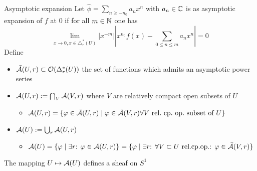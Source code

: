 \begin{frame}{Asymptotic expansion}
Let $\hat\phi=\sum_{n\geq -n_0}a_nx^n$ with $a_n\in\mathbb{C}$ is as asymptotic
expansion of $f$ at $0$ if for all $m\in\mathbb{N}$ one has
\begin{equation} \label{eq:asymptoticExpansion}
  \lim_{x\to 0,x\in\triangle_r^*(U)}
  \left|x^{-m}\right|\left|x^{n_{0}}f(x)-\sum_{0\leq n\leq m}a_{n}x^{n}\right|
  =0
\end{equation}
Define
\begin{itemize}
  \item $\bar{\mathcal{A}}(U,r)\subset\mathcal{O}(\Delta_r^*(U))$ the set of functions which
    admits an asymptotic power series
  \item $\mathcal{A}(U,r):=\bigcap_{V}\bar{\mathcal{A}}(V,r)$ where $V$ are relatively
    compact open subsets of $U$
    \begin{itemize}
      \item $\mathcal{A}(U,r)=\{\varphi\in \bar{\mathcal{A}}(U,r)
        \mid \varphi\in \bar{\mathcal{A}}(V,r)
        \forall V\text{ rel.\  cp.\  op.\  subset of }U\}$
    \end{itemize}
  \item $\mathcal{A}(U):=\bigcup_r\mathcal{A}(U,r)$%
    \begin{itemize}
      \item $\mathcal{A}(U)=\{\varphi\mid\exists r\text{: } \varphi\in\mathcal{A}(U,r)\}
        =\{\varphi\mid\exists r\text{: }
          \forall V\subset U\text{ rel.cp.op.}\text{: }
          \varphi\in\bar{\mathcal{A}}(V,r)\}$
    \end{itemize}
\end{itemize}
The mapping $U\mapsto\mathcal{A}(U)$ defines a sheaf on $S^1$
\end{frame}

